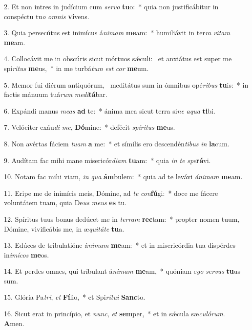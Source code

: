 2. Et non intres in judícium cum \textit{ser}\textit{vo} \textbf{tu}o:~*  quia non justificábitur in conspéctu tu\textit{o} \textit{om}\textit{nis} \textbf{vi}vens.\

3. Quia persecútus est inimícus á\textit{ni}\textit{mam} \textbf{me}am:~*  humiliávit in ter\textit{ra} \textit{vi}\textit{tam} \textbf{me}am.\

4. Collocávit me in obscúris sicut mórtuos sǽculi: \dag\  et anxiátus est super me spí\textit{ri}\textit{tus} \textbf{me}us,~*  in me turbá\textit{tum} \textit{est} \textit{cor} \textbf{me}um.\

5. Memor fui diérum antiquórum, \dag\  meditátus sum in ómnibus opé\textit{ri}\textit{bus} \textbf{tu}is:~*  in factis mánuum tuá\textit{rum} \textit{me}\textit{di}\textbf{tá}bar.\

6. Expándi manus \textit{me}\textit{as} \textbf{ad} te:~*  ánima mea sicut terra si\textit{ne} \textit{a}\textit{qua} \textbf{ti}bi.\

7. Velóciter exáu\textit{di} \textit{me}, \textbf{Dó}mine:~*  defécit \textit{spí}\textit{ri}\textit{tus} \textbf{me}us.\

8. Non avértas fáciem \textit{tu}\textit{am} \textbf{a} me:~*  et símilis ero descendén\textit{ti}\textit{bus} \textit{in} \textbf{la}cum.\

9. Audítam fac mihi mane misericór\textit{di}\textit{am} \textbf{tu}am:~*  quia \textit{in} \textit{te} \textit{spe}\textbf{rá}vi.\

10. Notam fac mihi viam, \textit{in} \textit{qua} \textbf{ám}bulem:~*  quia ad te levávi \textit{á}\textit{ni}\textit{mam} \textbf{me}am.\

11. Eripe me de inimícis meis, Dómine, ad \textit{te} \textit{con}\textbf{fú}gi:~*  doce me fácere voluntátem tuam, quia De\textit{us} \textit{me}\textit{us} \textbf{es} tu.\

12. Spíritus tuus bonus dedúcet me in \textit{ter}\textit{ram} \textbf{rec}tam:~*  propter nomen tuum, Dómine, vivificábis me, in æ\textit{qui}\textit{tá}\textit{te} \textbf{tu}a.\

13. Edúces de tribulatióne á\textit{ni}\textit{mam} \textbf{me}am:~*  et in misericórdia tua dispérdes in\textit{i}\textit{mí}\textit{cos} \textbf{me}os.\

14. Et perdes omnes, qui tríbulant á\textit{ni}\textit{mam} \textbf{me}am,~*  quóniam e\textit{go} \textit{ser}\textit{vus} \textbf{tu}us sum.\

15. Glória Pa\textit{tri}, \textit{et} \textbf{Fí}lio,~*  et Spi\textit{rí}\textit{tu}\textit{i} \textbf{Sanc}to.\

16. Sicut erat in princípio, et \textit{nunc}, \textit{et} \textbf{sem}per,~*  et in sǽcula sæ\textit{cu}\textit{ló}\textit{rum}. \textbf{A}men.\

